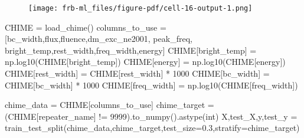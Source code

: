 \documentclass[
  letterpaper,
  DIV=11,
  numbers=noendperiod]{scrartcl}
\newenvironment{Shaded}{\begin{snugshade}}{\end{snugshade}}
\newcommand{\DecValTok}[1]{\textcolor[rgb]{0.68,0.00,0.00}{#1}}
\newcommand{\FloatTok}[1]{\textcolor[rgb]{0.68,0.00,0.00}{#1}}
\newcommand{\NormalTok}[1]{\textcolor[rgb]{0.00,0.23,0.31}{#1}}
\newcommand{\OperatorTok}[1]{\textcolor[rgb]{0.37,0.37,0.37}{#1}}
\newcommand{\StringTok}[1]{\textcolor[rgb]{0.13,0.47,0.30}{#1}}
\begin{document}
\begin{figure}[H]

{\centering \texttt{[image: frb-ml\_files/figure-pdf/cell-16-output-1.png]}

}

\end{figure}

\begin{Shaded}
\begin{Highlighting}[]
\NormalTok{CHIME }\OperatorTok{=}\NormalTok{ load\_chime()}
\NormalTok{columns\_to\_use }\OperatorTok{=}\NormalTok{ [}\StringTok{\textquotesingle{}bc\_width\textquotesingle{}}\NormalTok{,}\StringTok{\textquotesingle{}flux\textquotesingle{}}\NormalTok{,}\StringTok{\textquotesingle{}fluence\textquotesingle{}}\NormalTok{,}\StringTok{\textquotesingle{}dm\_exc\_ne2001\textquotesingle{}}\NormalTok{,}
                  \StringTok{\textquotesingle{}peak\_freq\textquotesingle{}}\NormalTok{,}
                  \StringTok{\textquotesingle{}bright\_temp\textquotesingle{}}\NormalTok{,}\StringTok{\textquotesingle{}rest\_width\textquotesingle{}}\NormalTok{,}\StringTok{\textquotesingle{}freq\_width\textquotesingle{}}\NormalTok{,}\StringTok{\textquotesingle{}energy\textquotesingle{}}\NormalTok{]}
\NormalTok{CHIME[}\StringTok{\textquotesingle{}bright\_temp\textquotesingle{}}\NormalTok{] }\OperatorTok{=}\NormalTok{ np.log10(CHIME[}\StringTok{\textquotesingle{}bright\_temp\textquotesingle{}}\NormalTok{])}
\NormalTok{CHIME[}\StringTok{\textquotesingle{}energy\textquotesingle{}}\NormalTok{] }\OperatorTok{=}\NormalTok{ np.log10(CHIME[}\StringTok{\textquotesingle{}energy\textquotesingle{}}\NormalTok{])}
\NormalTok{CHIME[}\StringTok{\textquotesingle{}rest\_width\textquotesingle{}}\NormalTok{] }\OperatorTok{=}\NormalTok{ CHIME[}\StringTok{\textquotesingle{}rest\_width\textquotesingle{}}\NormalTok{] }\OperatorTok{*} \DecValTok{1000}
\NormalTok{CHIME[}\StringTok{\textquotesingle{}bc\_width\textquotesingle{}}\NormalTok{] }\OperatorTok{=}\NormalTok{ CHIME[}\StringTok{\textquotesingle{}bc\_width\textquotesingle{}}\NormalTok{] }\OperatorTok{*} \DecValTok{1000}
\NormalTok{CHIME[}\StringTok{\textquotesingle{}freq\_width\textquotesingle{}}\NormalTok{] }\OperatorTok{=}\NormalTok{ np.log10(CHIME[}\StringTok{\textquotesingle{}freq\_width\textquotesingle{}}\NormalTok{])}

\NormalTok{chime\_data }\OperatorTok{=}\NormalTok{ CHIME[columns\_to\_use]}
\NormalTok{chime\_target }\OperatorTok{=}\NormalTok{ (CHIME[}\StringTok{\textquotesingle{}repeater\_name\textquotesingle{}}\NormalTok{] }\OperatorTok{!=} \StringTok{\textquotesingle{}{-}9999\textquotesingle{}}\NormalTok{).to\_numpy().astype(}\StringTok{\textquotesingle{}int\textquotesingle{}}\NormalTok{)}
\NormalTok{X,test\_X,y,test\_y }\OperatorTok{=}\NormalTok{ train\_test\_split(chime\_data,chime\_target,test\_size}\OperatorTok{=}\FloatTok{0.3}\NormalTok{,stratify}\OperatorTok{=}\NormalTok{chime\_target)}


\end{Highlighting}
\end{Shaded}
\end{document}
